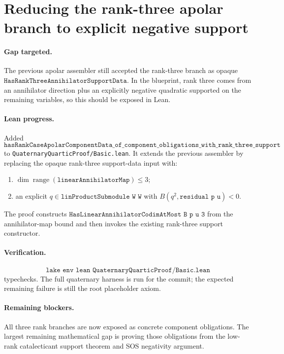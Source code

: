 \documentclass[11pt]{article}
\begin{document}
\section*{Reducing the rank-three apolar branch to explicit negative support}

\paragraph{Gap targeted.}
The previous apolar assembler still accepted the rank-three branch as opaque
\(\texttt{HasRankThreeAnnihilatorSupportData}\).  In the blueprint, rank three
comes from an annihilator direction plus an explicitly negative quadratic
supported on the remaining variables, so this should be exposed in Lean.

\paragraph{Lean progress.}
Added
\[
\texttt{hasRankCaseApolarComponentData\_of\_component\_obligations\_with\_rank\_three\_support}
\]
to \texttt{QuaternaryQuarticProof/Basic.lean}.  It extends the previous
assembler by replacing the opaque rank-three support-data input with:
\begin{enumerate}
\item \(\dim\operatorname{range}(\texttt{linearAnnihilatorMap})\le3\);
\item an explicit \(q\in\texttt{linProductSubmodule W W}\) with
  \(B(q^2,\texttt{residual p u})<0\).
\end{enumerate}
The proof constructs
\(\texttt{HasLinearAnnihilatorCodimAtMost B p u 3}\) from the annihilator-map
bound and then invokes the existing rank-three support constructor.

\paragraph{Verification.}
\[
\texttt{lake env lean QuaternaryQuarticProof/Basic.lean}
\]
typechecks.  The full quaternary harness is run for the commit; the expected
remaining failure is still the root placeholder axiom.

\paragraph{Remaining blockers.}
All three rank branches are now exposed as concrete component obligations.
The largest remaining mathematical gap is proving those obligations from the
low-rank catalecticant support theorem and SOS negativity argument.
\end{document}
